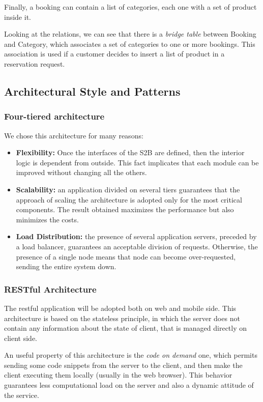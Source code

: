 \documentclass[table, 12pt]{article}
\begin{document}
Finally, a booking can contain a list of categories, each one with a set of product inside it.

Looking at the relations, we can see that there is a \textit{bridge table} between Booking and Category, which associates a set of categories to one or more bookings. This association is used if a customer decides to insert a list of product in a reservation request.

\subsection{Architectural Style and Patterns}
\subsubsection{Four-tiered architecture}
We chose this architecture for many reasons:
\begin{itemize}
    \item \textbf{Flexibility:} Once the interfaces of the S2B are defined, then the interior logic is dependent from outside. This fact implicates that each module can be improved without changing all the others.
    \item \textbf{Scalability:} an application divided on several tiers guarantees that the approach of scaling the architecture is adopted only for the most critical components. The result obtained maximizes the performance but also minimizes the costs.
    \item \textbf{Load Distribution:} the presence of several application servers, preceded by a load balancer, guarantees an acceptable division of requests. Otherwise, the presence of a single node means that node can become over-requested, sending the entire system down.
\end{itemize}

\subsubsection{RESTful Architecture}
\label{REST}
The restful application will be adopted both on web and mobile side. This architecture is based on the stateless principle, in which the server does not contain any information about the state of client, that is managed directly on client side.

An useful property of this architecture is the \textit{code on demand} one, which permits sending some code snippets from the server to the client, and then make the client executing them locally (usually in the web browser). This behavior guarantees less computational load on the server and also a dynamic attitude of the service.
\end{document}
